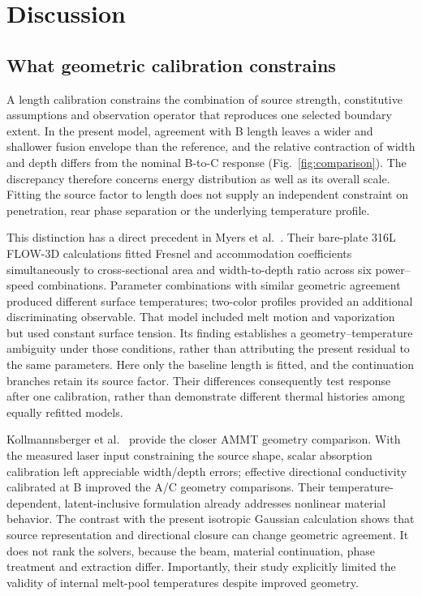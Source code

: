 \section{Discussion}
\label{sec:discussion}

\subsection{What geometric calibration constrains}
A length calibration constrains the combination of source strength, constitutive assumptions and observation operator that reproduces one selected boundary extent. In the present model, agreement with B length leaves a wider and shallower fusion envelope than the reference, and the relative contraction of width and depth differs from the nominal B-to-C response (Fig.~\ref{fig:comparison}). The discrepancy therefore concerns energy distribution as well as its overall scale. Fitting the source factor to length does not supply an independent constraint on penetration, rear phase separation or the underlying temperature profile.

This distinction has a direct precedent in Myers et al.~\cite{myers2023}. Their bare-plate 316L FLOW-3D calculations fitted Fresnel and accommodation coefficients simultaneously to cross-sectional area and width-to-depth ratio across six power--speed combinations. Parameter combinations with similar geometric agreement produced different surface temperatures; two-color profiles provided an additional discriminating observable. That model included melt motion and vaporization but used constant surface tension. Its finding establishes a geometry--temperature ambiguity under those conditions, rather than attributing the present residual to the same parameters. Here only the baseline length is fitted, and the continuation branches retain its source factor. Their differences consequently test response after one calibration, rather than demonstrate different thermal histories among equally refitted models.

Kollmannsberger et al.~\cite{kollmannsberger2019} provide the closer AMMT geometry comparison. With the measured laser input constraining the source shape, scalar absorption calibration left appreciable width/depth errors; effective directional conductivity calibrated at B improved the A/C geometry comparisons. Their temperature-dependent, latent-inclusive formulation already addresses nonlinear material behavior. The contrast with the present isotropic Gaussian calculation shows that source representation and directional closure can change geometric agreement. It does not rank the solvers, because the beam, material continuation, phase treatment and extraction differ. Importantly, their study explicitly limited the validity of internal melt-pool temperatures despite improved geometry.

